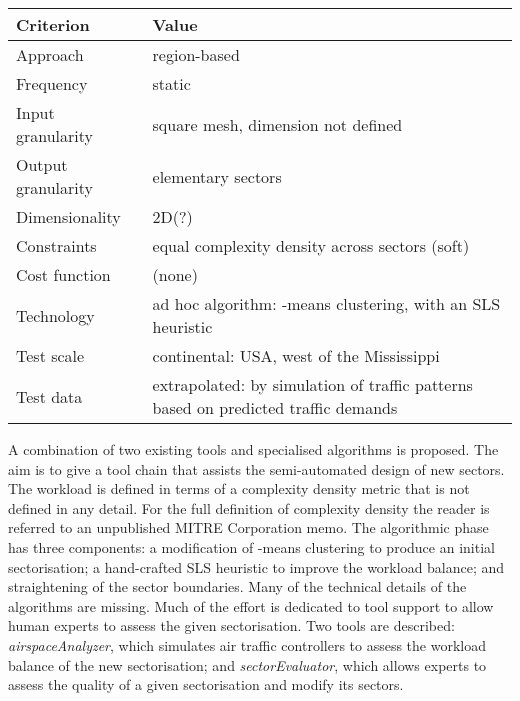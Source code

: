 \documentclass[a4paper,12pt]{article}
\begin{document}
\begin{center}
\begin{tabular}{|l|l|}
  \hline
  Criterion & Value \\
  \hline\hline
  Approach & region-based \\ \hline
  Frequency & static \\ \hline
  Input granularity & square mesh, dimension not defined \\ \hline
  Output granularity & elementary sectors \\ \hline
  Dimensionality & 2D(?) \\ \hline
  Constraints & equal complexity density across sectors (soft) \\ \hline
  Cost function & (none) \\ \hline
  Technology & ad hoc algorithm: -means clustering, with an SLS heuristic \\ \hline
  Test scale & continental: USA, west of the Mississippi \\ \hline
  Test data & \parbox{11.5cm}{extrapolated: by simulation of traffic
    patterns based on predicted traffic demands} \\ \hline
\end{tabular}
\end{center}
A combination of two existing tools
\cite{bhadra2005future,wanke2004progressive} and specialised
algorithms is proposed.  The aim is to give a tool chain that assists
the semi-automated design of new sectors.  The workload is defined in
terms of a complexity density metric that is not defined in any
detail.  For the full definition of complexity density the reader is
referred to an unpublished MITRE Corporation memo.  The algorithmic
phase has three components: a modification of -means clustering
\cite{lloyd:k-means:1982} to produce an initial sectorisation; a
hand-crafted SLS heuristic to improve the workload balance; and
straightening of the sector boundaries.  Many of the technical details
of the algorithms are missing.  Much of the effort is dedicated to
tool support to allow human experts to assess the given sectorisation.
Two tools are described: \emph{airspaceAnalyzer}, which simulates air
traffic controllers to assess the workload balance of the new
sectorisation; and \emph{sectorEvaluator}, which allows experts to
assess the quality of a given sectorisation and modify its sectors.

\subsection{\cite{Martinez:GNC07}}
\end{document}
